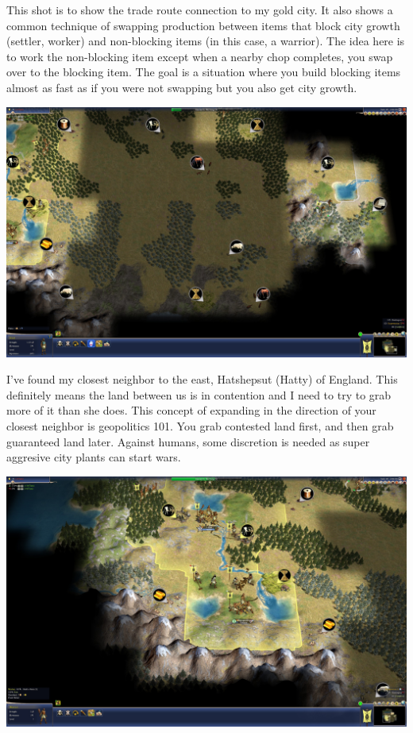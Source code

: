 \documentclass[10pt]{article}
\begin{document}
This shot is to show the trade route connection to my gold city. It also shows a common technique of
swapping production between items that block city growth (settler, worker) and non-blocking items (in
this case, a warrior). The idea here is to work the non-blocking item except when a nearby chop completes,
you swap over to the blocking item. The goal is a situation where you build blocking items almost as fast
as if you were not swapping but you also get city growth.

\includegraphics[width=1.0\textwidth]{19}

I've found my closest neighbor to the east, Hatshepsut (Hatty) of England. This definitely means the land
between us is in contention and I need to try to grab more of it than she does. This concept of expanding
in the direction of your closest neighbor is geopolitics 101. You grab contested land first, and then
grab guaranteed land later. Against humans, some discretion is needed as super aggresive city plants
can start wars.

\includegraphics[width=1.0\textwidth]{21}
\end{document}

